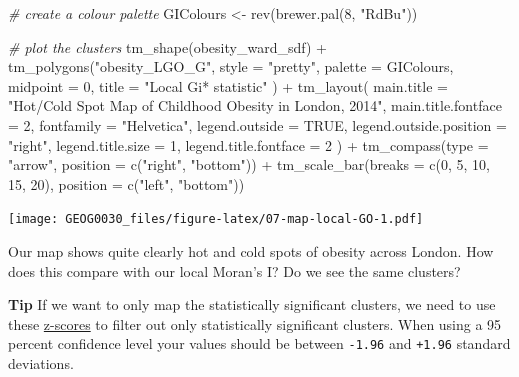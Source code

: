 \documentclass[
]{book}
\newenvironment{Shaded}{\begin{snugshade}}{\end{snugshade}}
\newcommand{\AttributeTok}[1]{\textcolor[rgb]{0.77,0.63,0.00}{#1}}
\newcommand{\CommentTok}[1]{\textcolor[rgb]{0.56,0.35,0.01}{\textit{#1}}}
\newcommand{\ConstantTok}[1]{\textcolor[rgb]{0.00,0.00,0.00}{#1}}
\newcommand{\DecValTok}[1]{\textcolor[rgb]{0.00,0.00,0.81}{#1}}
\newcommand{\FunctionTok}[1]{\textcolor[rgb]{0.00,0.00,0.00}{#1}}
\newcommand{\NormalTok}[1]{#1}
\newcommand{\OtherTok}[1]{\textcolor[rgb]{0.56,0.35,0.01}{#1}}
\newcommand{\SpecialCharTok}[1]{\textcolor[rgb]{0.00,0.00,0.00}{#1}}
\newcommand{\StringTok}[1]{\textcolor[rgb]{0.31,0.60,0.02}{#1}}
\begin{document}
\begin{Shaded}
\begin{Highlighting}[]
\CommentTok{\# create a colour palette}
\NormalTok{GIColours }\OtherTok{\textless{}{-}} \FunctionTok{rev}\NormalTok{(}\FunctionTok{brewer.pal}\NormalTok{(}\DecValTok{8}\NormalTok{, }\StringTok{"RdBu"}\NormalTok{))}

\CommentTok{\# plot the clusters}
\FunctionTok{tm\_shape}\NormalTok{(obesity\_ward\_sdf) }\SpecialCharTok{+}
  \FunctionTok{tm\_polygons}\NormalTok{(}\StringTok{"obesity\_LGO\_G"}\NormalTok{,}
    \AttributeTok{style =} \StringTok{"pretty"}\NormalTok{, }\AttributeTok{palette =}\NormalTok{ GIColours,}
    \AttributeTok{midpoint =} \DecValTok{0}\NormalTok{, }\AttributeTok{title =} \StringTok{"Local Gi* statistic"}
\NormalTok{  ) }\SpecialCharTok{+}
  \FunctionTok{tm\_layout}\NormalTok{(}
    \AttributeTok{main.title =} \StringTok{"Hot/Cold Spot Map of Childhood Obesity in London, 2014"}\NormalTok{,}
    \AttributeTok{main.title.fontface =} \DecValTok{2}\NormalTok{, }\AttributeTok{fontfamily =} \StringTok{"Helvetica"}\NormalTok{,}
    \AttributeTok{legend.outside =} \ConstantTok{TRUE}\NormalTok{,}
    \AttributeTok{legend.outside.position =} \StringTok{"right"}\NormalTok{,}
    \AttributeTok{legend.title.size =} \DecValTok{1}\NormalTok{,}
    \AttributeTok{legend.title.fontface =} \DecValTok{2}
\NormalTok{  ) }\SpecialCharTok{+}
  \FunctionTok{tm\_compass}\NormalTok{(}\AttributeTok{type =} \StringTok{"arrow"}\NormalTok{, }\AttributeTok{position =} \FunctionTok{c}\NormalTok{(}\StringTok{"right"}\NormalTok{, }\StringTok{"bottom"}\NormalTok{)) }\SpecialCharTok{+}
  \FunctionTok{tm\_scale\_bar}\NormalTok{(}\AttributeTok{breaks =} \FunctionTok{c}\NormalTok{(}\DecValTok{0}\NormalTok{, }\DecValTok{5}\NormalTok{, }\DecValTok{10}\NormalTok{, }\DecValTok{15}\NormalTok{, }\DecValTok{20}\NormalTok{), }\AttributeTok{position =} \FunctionTok{c}\NormalTok{(}\StringTok{"left"}\NormalTok{, }\StringTok{"bottom"}\NormalTok{))}
\end{Highlighting}
\end{Shaded}

\texttt{[image: GEOG0030\_files/figure-latex/07-map-local-GO-1.pdf]}

Our map shows quite clearly hot and cold spots of obesity across London. How does this compare with our local Moran's I? Do we see the same clusters?

\textbf{Tip}
If we want to only map the statistically significant clusters, we need to use these \href{https://en.wikipedia.org/wiki/Standard_score}{z-scores} to filter out only statistically significant clusters. When using a 95 percent confidence level your values should be between \texttt{-1.96} and \texttt{+1.96} standard deviations.
\end{document}
